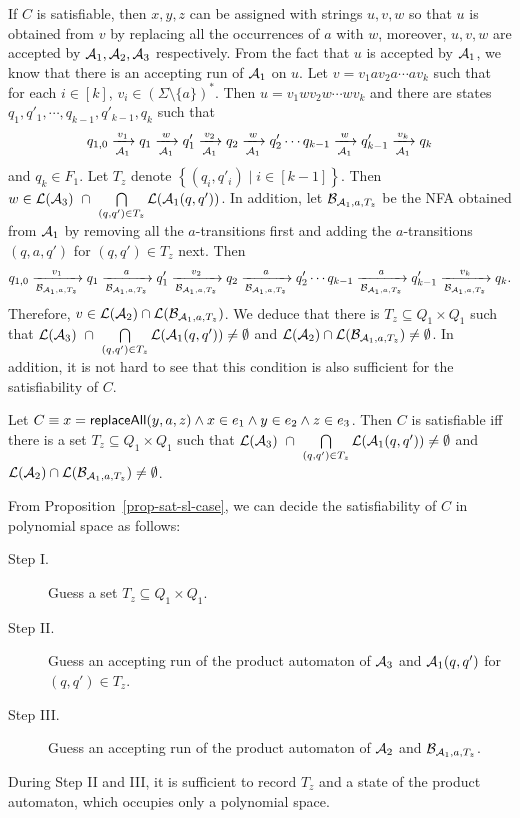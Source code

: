 If $C$ is satisfiable, then $x, y, z$ can be assigned with strings $u, v, w$ so that $u$ is obtained from $v$ by replacing all the occurrences of $a$ with $w$, moreover, $u, v, w$ are accepted by $\mathcal{A}_1, \mathcal{A}_2, \mathcal{A}_3$ respectively. From the fact that $u$ is accepted by $\mathcal{A}_1$, we know that there is an accepting run of $\mathcal{A}_1$ on $u$. Let $v = v_1 a v_2 a \cdots a v_k$ such that for each $i \in [k]$, $v_i \in (\Sigma \setminus \{a\})^*$. Then $u = v_1 w v_2 w \cdots w v_k$ and there are states $q_1, q'_1, \cdots, q_{k-1}, q'_{k-1}, q_k$  such that 
%
$$
q_{1,0} \xrightarrow[\mathcal{A}_1]{v_1} q_1 \xrightarrow[\mathcal{A}_1]{w} q'_1 \xrightarrow[\mathcal{A}_1]{v_2} q_2 \xrightarrow[\mathcal{A}_1]{w} q'_2 \cdots q_{k-1} \xrightarrow[\mathcal{A}_1]{w} q'_{k-1} \xrightarrow[\mathcal{A}_1]{v_k} q_k
$$
%
 and $q_k \in F_{1}$. Let $T_z$ denote $\left\{(q_i, q'_i) \mid i \in [k-1] \right\}$. Then $w \in \mathcal{L}(\mathcal{A}_3)\ \cap\ \bigcap \limits_{(q, q') \in T_z} \mathcal{L}(\mathcal{A}_1(q, q'))$. In addition, let  $\mathcal{B}_{\mathcal{A}_1,a,T_z}$ be the NFA obtained from $\mathcal{A}_1$ by removing all the $a$-transitions first and adding the $a$-transitions $(q, a, q')$ for $(q, q') \in T_z$ next. Then 
$$
q_{1,0} \xrightarrow[\mathcal{B}_{\mathcal{A}_1,a,T_z}]{v_1} q_1 \xrightarrow[\mathcal{B}_{\mathcal{A}_1,a,T_z}]{a} q'_1 \xrightarrow[\mathcal{B}_{\mathcal{A}_1,a,T_z}]{v_2} q_2 \xrightarrow[\mathcal{B}_{\mathcal{A}_1,a,T_z}]{a} q'_2 \cdots q_{k-1} \xrightarrow[\mathcal{B}_{\mathcal{A}_1,a,T_z}]{a} q'_{k-1} \xrightarrow[\mathcal{B}_{\mathcal{A}_1,a,T_z}]{v_k} q_k.
$$
%
Therefore, 
$v \in \mathcal{L}(\mathcal{A}_2) \cap \mathcal{L}(\mathcal{B}_{\mathcal{A}_1,a,T_z})$. We deduce that there is $T_z \subseteq Q_1 \times Q_1$ such that $\mathcal{L}(\mathcal{A}_3)\ \cap\ \bigcap \limits_{(q, q') \in T_z} \mathcal{L}(\mathcal{A}_1(q, q')) \neq \emptyset$ and $ \mathcal{L}(\mathcal{A}_2) \cap \mathcal{L}(\mathcal{B}_{\mathcal{A}_1,a,T_z}) \neq \emptyset$. In addition, it is not hard to see that this condition is also sufficient for the satisfiability of $C$.

\begin{proposition}\label{prop-sat-sl-case}
Let $C \equiv x = \mathsf{replaceAll}(y, a, z) \wedge x \in e_1 \wedge y \in e_2 \wedge z \in e_3$. Then $C$ is satisfiable iff there is a set $T_{z} \subseteq Q_1 \times Q_1$ such that $\mathcal{L}(\mathcal{A}_3)\ \cap\ \bigcap \limits_{(q, q') \in T_z} \mathcal{L}(\mathcal{A}_1(q, q')) \neq \emptyset$ and $ \mathcal{L}(\mathcal{A}_2) \cap \mathcal{L}(\mathcal{B}_{\mathcal{A}_1,a,T_z}) \neq \emptyset$.
\end{proposition}

From Proposition~\ref{prop-sat-sl-case}, we can decide the satisfiability of $C$ in polynomial space as follows: 
\begin{description}
\item[Step I.] Guess a set $T_{z} \subseteq Q_1 \times Q_1$. 
%
\item[Step II.] Guess an accepting run of the product automaton of $\mathcal{A}_3$ and $\mathcal{A}_1(q, q')$ for $(q,q') \in T_{z}$. 
%
\item[Step III.] Guess an accepting run of the product automaton of $\mathcal{A}_2$ and $\mathcal{B}_{\mathcal{A}_1, a,  T_{z}}$. 
\end{description}
During Step II and III, it is sufficient to record $T_z$ and a state of the product automaton, which occupies only a polynomial space.

